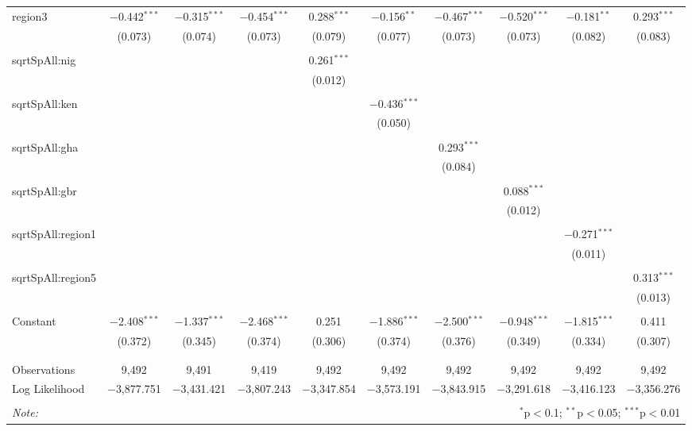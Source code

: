 \begin{table}[!htbp]
\begin{tabular}{@{\extracolsep{5pt}}lccccccccc}
 region3 & $-$0.442$^{***}$ & $-$0.315$^{***}$ & $-$0.454$^{***}$ & 0.288$^{***}$ & $-$0.156$^{**}$ & $-$0.467$^{***}$ & $-$0.520$^{***}$ & $-$0.181$^{**}$ & 0.293$^{***}$ \\ 
  & (0.073) & (0.074) & (0.073) & (0.079) & (0.077) & (0.073) & (0.073) & (0.082) & (0.083) \\ 
  & & & & & & & & & \\ 
 sqrtSpAll:nig &  &  &  & 0.261$^{***}$ &  &  &  &  &  \\ 
  &  &  &  & (0.012) &  &  &  &  &  \\ 
  & & & & & & & & & \\ 
 sqrtSpAll:ken &  &  &  &  & $-$0.436$^{***}$ &  &  &  &  \\ 
  &  &  &  &  & (0.050) &  &  &  &  \\ 
  & & & & & & & & & \\ 
 sqrtSpAll:gha &  &  &  &  &  & 0.293$^{***}$ &  &  &  \\ 
  &  &  &  &  &  & (0.084) &  &  &  \\ 
  & & & & & & & & & \\ 
 sqrtSpAll:gbr &  &  &  &  &  &  & 0.088$^{***}$ &  &  \\ 
  &  &  &  &  &  &  & (0.012) &  &  \\ 
  & & & & & & & & & \\ 
 sqrtSpAll:region1 &  &  &  &  &  &  &  & $-$0.271$^{***}$ &  \\ 
  &  &  &  &  &  &  &  & (0.011) &  \\ 
  & & & & & & & & & \\ 
 sqrtSpAll:region5 &  &  &  &  &  &  &  &  & 0.313$^{***}$ \\ 
  &  &  &  &  &  &  &  &  & (0.013) \\ 
  & & & & & & & & & \\ 
 Constant & $-$2.408$^{***}$ & $-$1.337$^{***}$ & $-$2.468$^{***}$ & 0.251 & $-$1.886$^{***}$ & $-$2.500$^{***}$ & $-$0.948$^{***}$ & $-$1.815$^{***}$ & 0.411 \\ 
  & (0.372) & (0.345) & (0.374) & (0.306) & (0.374) & (0.376) & (0.349) & (0.334) & (0.307) \\ 
  & & & & & & & & & \\ 
\hline \\[-1.8ex] 
Observations & 9,492 & 9,491 & 9,419 & 9,492 & 9,492 & 9,492 & 9,492 & 9,492 & 9,492 \\ 
Log Likelihood & $-$3,877.751 & $-$3,431.421 & $-$3,807.243 & $-$3,347.854 & $-$3,573.191 & $-$3,843.915 & $-$3,291.618 & $-$3,416.123 & $-$3,356.276 \\ 
\hline 
\hline \\[-1.8ex] 
\textit{Note:}  & \multicolumn{9}{r}{$^{*}$p$<$0.1; $^{**}$p$<$0.05; $^{***}$p$<$0.01} \\ 
\end{tabular} 
\end{table} 
